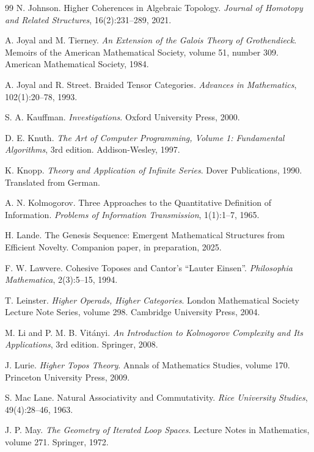 \documentclass[11pt]{article}
\theoremstyle{definition}
\theoremstyle{remark}
\begin{document}
\begin{thebibliography}{99}
N. Johnson.
Higher Coherences in Algebraic Topology.
\textit{Journal of Homotopy and Related Structures}, 16(2):231--289, 2021.

A. Joyal and M. Tierney.
\textit{An Extension of the Galois Theory of Grothendieck}.
Memoirs of the American Mathematical Society, volume 51, number 309. American Mathematical Society, 1984.

A. Joyal and R. Street.
Braided Tensor Categories.
\textit{Advances in Mathematics}, 102(1):20--78, 1993.

S. A. Kauffman.
\textit{Investigations}.
Oxford University Press, 2000.

D. E. Knuth.
\textit{The Art of Computer Programming, Volume 1: Fundamental Algorithms}, 3rd edition.
Addison-Wesley, 1997.

K. Knopp.
\textit{Theory and Application of Infinite Series}.
Dover Publications, 1990. Translated from German.

A. N. Kolmogorov.
Three Approaches to the Quantitative Definition of Information.
\textit{Problems of Information Transmission}, 1(1):1--7, 1965.

H. Lande.
The Genesis Sequence: Emergent Mathematical Structures from Efficient Novelty.
Companion paper, in preparation, 2025.

F. W. Lawvere.
Cohesive Toposes and Cantor's ``Lauter Einsen''.
\textit{Philosophia Mathematica}, 2(3):5--15, 1994.

T. Leinster.
\textit{Higher Operads, Higher Categories}.
London Mathematical Society Lecture Note Series, volume 298. Cambridge University Press, 2004.

M. Li and P. M. B. Vitányi.
\textit{An Introduction to Kolmogorov Complexity and Its Applications}, 3rd edition.
Springer, 2008.

J. Lurie.
\textit{Higher Topos Theory}.
Annals of Mathematics Studies, volume 170. Princeton University Press, 2009.

S. Mac Lane.
Natural Associativity and Commutativity.
\textit{Rice University Studies}, 49(4):28--46, 1963.

J. P. May.
\textit{The Geometry of Iterated Loop Spaces}.
Lecture Notes in Mathematics, volume 271. Springer, 1972.


\end{thebibliography}
\end{document}
